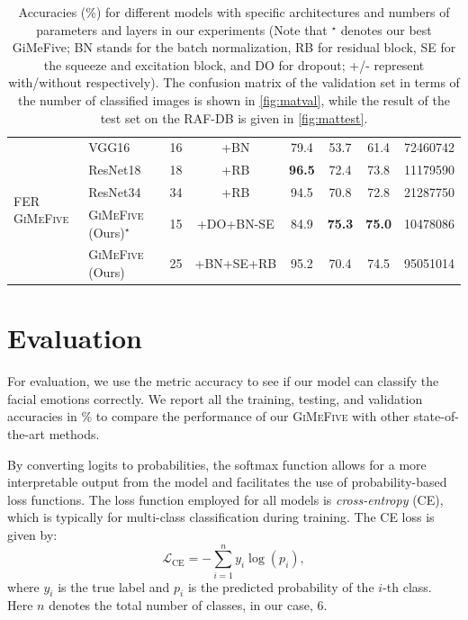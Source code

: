 \begin{table}[ht]
\begin{tabular}{@{}llcccccr@{}}
    \midrule
    \midrule
    \multirow{5}{*}{FER \textsc{GiMeFive}} & VGG16~\cite{SimonyanZ14a} & 16 & +BN & 79.4 & 53.7 & 61.4 & 72460742 \\
    & ResNet18~\cite{HeZRS16} & 18 & +RB  & \textbf{96.5} & 72.4 & 73.8 & 11179590 \\
    & ResNet34~\cite{HeZRS16} & 34 & +RB  & 94.5 & 70.8 & 72.8 & 21287750 \\
    &\textsc{GiMeFive} (Ours)\textcolor{LMUGreen}{$^\star$} & 15 & +DO+BN-SE & 84.9 & \textbf{75.3} & \textbf{75.0} & 10478086 \\
    &\textsc{GiMeFive} (Ours) & 25 & +BN+SE+RB & 95.2 & 70.4 & 74.5 & 95051014 \\
    \bottomrule
  \end{tabular}
  \caption{Accuracies (\%) for different models with specific architectures and numbers of parameters and layers in our experiments 
  (Note that \textcolor{LMUGreen}{$^\star$} denotes our best GiMeFive; 
  BN stands for the batch normalization, 
  RB for residual block, 
  SE for the squeeze and excitation block, 
  and DO for dropout; 
  +/- represent with/without respectively). 
  The confusion matrix of the validation set in terms of the number of classified images is shown in \cref{fig:matval}, 
  while the result of the test set on the RAF-DB is given in \cref{fig:mattest}.} 
  \label{tab:model}
\end{table}

\section{Evaluation}
\label{sec:evaluation}

For evaluation, we use the metric accuracy to see if our model can classify the facial emotions correctly. 
We report all the training, testing, and validation accuracies in \% 
to compare the performance of our \textsc{GiMeFive} with other state-of-the-art methods. 

By converting logits to probabilities, 
the softmax function allows for a more interpretable output from the model and facilitates the use of probability-based loss functions. 
The loss function employed for all models is \textit{cross-entropy} (CE), 
which is typically for multi-class classification during training. 
The CE loss is given by: 
\begin{equation}
  \label{eq:ce}
  \mathcal{L}_{\text{CE}} = -\sum_{i=1}^{n} y_i \log(p_i),
\end{equation}
where $y_i$ is the true label and $p_i$ is the predicted probability of the $i$-th class. 
Here $n$ denotes the total number of classes, in our case, 6.

